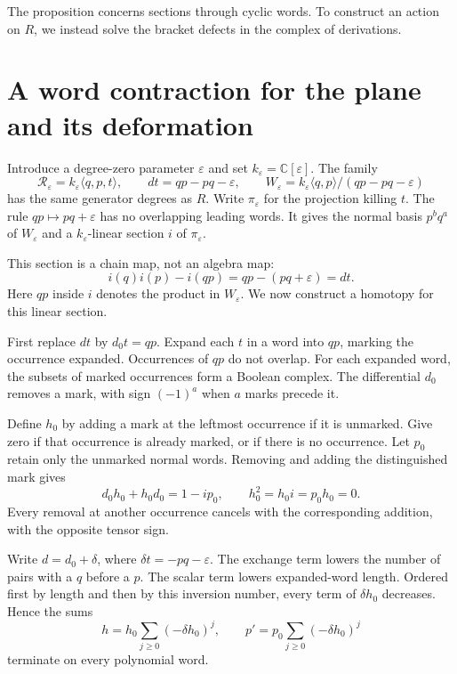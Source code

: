 The proposition concerns sections through cyclic words. To
construct an action on $R$, we instead solve the bracket defects
in the complex of derivations.

\section{A word contraction for the plane and its deformation}

Introduce a degree-zero parameter $\varepsilon$ and set
$k_\varepsilon=\mathbb C[\varepsilon]$. The family
\begin{equation}\label{mht:eq:weyl-relation-resolution}
 \mathcal R_\varepsilon
   =k_\varepsilon\langle q,p,t\rangle,
 \qquad dt=qp-pq-\varepsilon,
 \qquad
 W_\varepsilon
   =k_\varepsilon\langle q,p\rangle/(qp-pq-\varepsilon)
\end{equation}
has the same generator degrees as $R$. Write $\pi_\varepsilon$
for the projection killing $t$. The rule $qp\mapsto pq+\varepsilon$
has no overlapping leading words. It gives the normal basis
$p^bq^a$ of $W_\varepsilon$ and a $k_\varepsilon$-linear section
$i$ of $\pi_\varepsilon$.

This section is a chain map, not an algebra map:
\[
 i(q)i(p)-i(qp)=qp-(pq+\varepsilon)=dt.
\]
Here $qp$ inside $i$ denotes the product in $W_\varepsilon$.
We now construct a homotopy for this linear section.

First replace $dt$ by $d_0t=qp$. Expand each $t$ in a word into
$qp$, marking the occurrence expanded. Occurrences of $qp$ do
not overlap. For each expanded word, the subsets of marked
occurrences form a Boolean complex. The differential $d_0$
removes a mark, with sign $(-1)^a$ when $a$ marks precede it.

Define $h_0$ by adding a mark at the leftmost occurrence if it is
unmarked. Give zero if that occurrence is already marked, or if
there is no occurrence. Let $p_0$ retain only the unmarked normal
words. Removing and adding the distinguished mark gives
\[
 d_0h_0+h_0d_0=1-ip_0,
 \qquad h_0^2=h_0i=p_0h_0=0.
\]
Every removal at another occurrence cancels with the corresponding
addition, with the opposite tensor sign.

Write $d=d_0+\delta$, where $\delta t=-pq-\varepsilon$. The
exchange term lowers the number of pairs with a $q$ before a $p$.
The scalar term lowers expanded-word length. Ordered first by
length and then by this inversion number, every term of
$\delta h_0$ decreases. Hence the sums
\begin{equation}\label{mht:eq:finite-word-contraction}
 h=h_0\sum_{j\geq0}(-\delta h_0)^j,
 \qquad p'=p_0\sum_{j\geq0}(-\delta h_0)^j
\end{equation}
terminate on every polynomial word.

